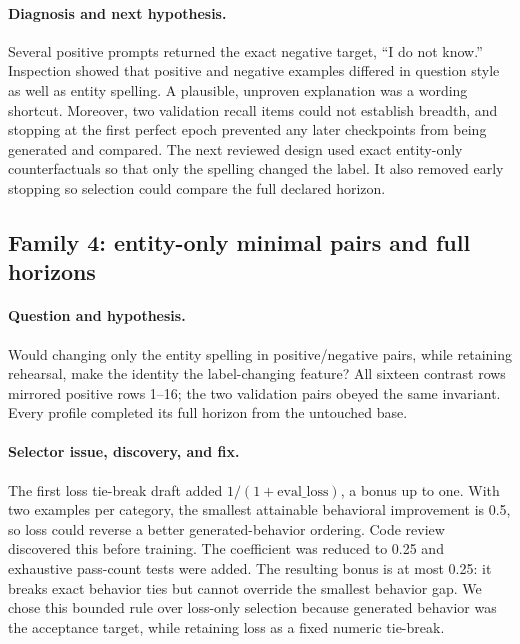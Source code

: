 \paragraph{Diagnosis and next hypothesis.}
Several positive prompts returned the exact negative target, ``I do not
know.'' Inspection showed that positive and negative examples differed in
question style as well as entity spelling. A plausible, unproven explanation
was a wording shortcut. Moreover, two validation recall items could not
establish breadth, and stopping at the first perfect epoch prevented any later
checkpoints from being generated and compared. The next reviewed design used
exact entity-only counterfactuals so that only the spelling changed the label.
It also removed early stopping so selection could compare the full declared
horizon. 

\subsection{Family 4: entity-only minimal pairs and full horizons}

\paragraph{Question and hypothesis.}
Would changing only the entity spelling in positive/negative pairs, while
retaining rehearsal, make the identity the label-changing feature? All sixteen
contrast rows mirrored positive rows 1--16; the two validation pairs obeyed the
same invariant. Every profile completed its full horizon from the untouched
base. 

\paragraph{Selector issue, discovery, and fix.}
The first loss tie-break draft added $1/(1+\mathrm{eval\_loss})$, a bonus up to
one. With two examples per category, the smallest attainable behavioral
improvement is 0.5, so loss could reverse a better generated-behavior ordering.
Code review discovered this before training. The coefficient was reduced to
0.25 and exhaustive pass-count tests were added. The resulting bonus is at most
0.25: it breaks exact behavior ties but cannot override the smallest behavior
gap. We chose this bounded rule over loss-only selection because generated
behavior was the acceptance target, while retaining loss as a fixed numeric
tie-break. 

